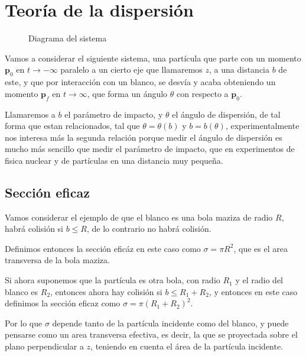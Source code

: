 \chapter{Teoría de la dispersión}
\begin{marginfigure}[0pt]
    \def\svgwidth{3.5 cm}
    \small
    \vspace{20pt}
	
\end{marginfigure}
\begin{figure}[H]
    \def\svgwidth{15 cm}
    \normalsize
	
    \vspace{15pt}
    \caption{Diagrama del sistema}
\end{figure}
\vspace{15pt}

Vamos a considerar el siguiente sistema, una partícula que parte con un momento $\mathbf{p}_0$ en $t\rightarrow -\infty$ paralelo a un cierto eje que llamaremos $z$, a una distancia $b$ de este, y que por interacción con un blanco, se desvía y acaba obteniendo un momento $\mathbf{p}_f$ en $t\rightarrow \infty$, que forma un ángulo $\theta$ con respecto a $\mathbf{p}_0$.

Llamaremos a $b$ el parámetro de impacto, y $\theta$ el ángulo de dispersión, de tal forma que estan relacionados, tal que $\theta = \theta(b)$ y $b = b(\theta)$, experimentalmente nos interesa más la segunda relación porque medir el ángulo de dispersión es mucho más sencillo que medir el parámetro de impacto, que en experimentos de fisica nuclear y de partículas en una distancia muy pequeña.

\section{Sección eficaz} 
Vamos considerar el ejemplo de que el blanco es una bola maziza de radio $R$, habrá colisión si $b \leq R$, de lo contrario no habrá colisión.

Definimos entonces la sección eficáz en este caso como $\sigma=\pi R^2$, que es el area transversa de la bola maziza.

Si ahora suponemos que la partícula es otra bola, con radio $R_1$ y el radio del blanco es $R_2$, entonces ahora hay colisión si $b \leq R_1+R_2$, y entonces en este caso definimos la sección eficaz como $\sigma=\pi (R_1+R_2)^2$.

Por lo que $\sigma$ depende tanto de la partícula incidente como del blanco, y puede pensarse como un area transversa efectiva, es decir, la que se proyectada sobre el plano perpendicular a $z$, teniendo en cuenta el área de la partícula incidente.

